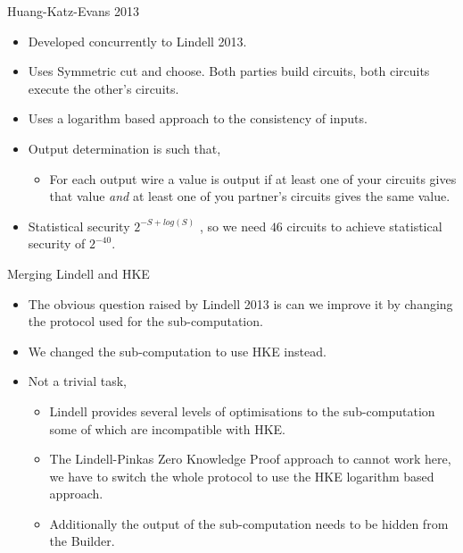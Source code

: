 \documentclass[t, 12pt]{beamer}            %
\begin{document}
\begin{frame}{Huang-Katz-Evans 2013}
	\begin{itemize} %
		\item Developed concurrently to Lindell 2013.
		\item Uses Symmetric cut and choose. Both parties build circuits, both circuits execute the other's circuits.
		\item Uses a logarithm based approach to the consistency of inputs.
		\item Output determination is such that,
		\begin{itemize}
			\item For each output wire a value is output if at least one of your circuits gives that value \emph{and} at least one of you partner's circuits gives the same value.
		\end{itemize}
		\item Statistical security $2^{-S + log(S)}$ , so we need $46$ circuits to achieve statistical security of $2^{-40}$.
	\end{itemize}

\end{frame}


\begin{frame}{Merging Lindell and HKE}
	\begin{itemize} %
		\item The obvious question raised by Lindell 2013 is can we improve it by changing the protocol used for the sub-computation.
		\item We changed the sub-computation to use HKE instead.
		\item Not a trivial task,
		\begin{itemize}
			\item Lindell provides several levels of optimisations to the sub-computation some of which are incompatible with HKE.
			\item The Lindell-Pinkas Zero Knowledge Proof approach to cannot work here, we have to switch the whole protocol to use the HKE logarithm based approach.
			\item Additionally the output of the sub-computation needs to be hidden from the Builder. %
		\end{itemize}
	\end{itemize}

\end{frame}
\end{document}
